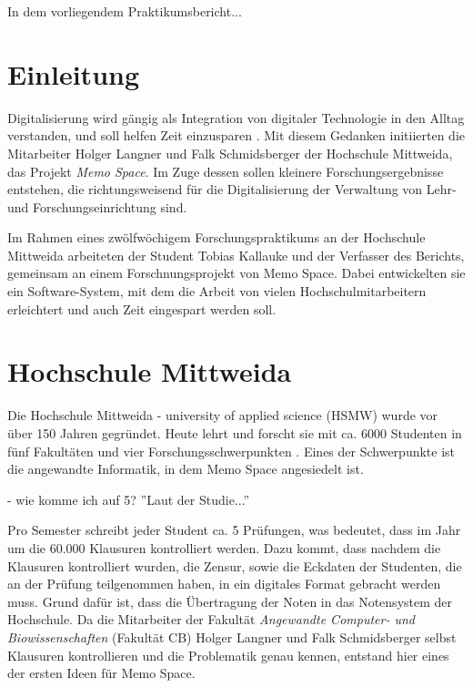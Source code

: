 \documentclass[nomenclature, onesided, 150]{HSMW-Thesis}
\begin{document}
\begin{Referat}
In dem vorliegendem Praktikumsbericht...

\end{Referat}


\Hauptteil


\chapter{Einleitung}
	Digitalisierung wird gängig als Integration von digitaler Technologie in den Alltag verstanden, und soll helfen Zeit einzusparen \cite{digital}. Mit diesem Gedanken initiierten die Mitarbeiter Holger Langner und Falk Schmidsberger der Hochschule Mittweida, das Projekt \textit{Memo Space}. Im Zuge dessen sollen kleinere Forschungsergebnisse entstehen, die richtungsweisend für die Digitalisierung der Verwaltung von Lehr- und Forschungseinrichtung sind.

	Im Rahmen eines zwölfwöchigem Forschungspraktikums an der Hochschule Mittweida arbeiteten der Student Tobias Kallauke und der Verfasser des Berichts, gemeinsam an einem Forschnungsprojekt von Memo Space. Dabei entwickelten sie ein Software-System, mit dem die Arbeit von vielen Hochschulmitarbeitern erleichtert und auch Zeit eingespart werden soll.


\chapter{Hochschule Mittweida}
	Die Hochschule Mittweida - university of applied science (HSMW)  wurde vor über 150 Jahren gegründet. Heute lehrt und forscht sie mit ca. 6000 Studenten in fünf Fakultäten und vier Forschungsschwerpunkten\cite{noauthor_hochschule_nodate} . Eines der Schwerpunkte ist die angewandte Informatik, in dem Memo Space angesiedelt ist.
	
	- wie komme ich auf 5? ''Laut der Studie...''
	
	Pro Semester schreibt jeder Student ca. 5 Prüfungen, was bedeutet, dass im Jahr um die 60.000 Klausuren kontrolliert werden. Dazu kommt, dass nachdem die Klausuren kontrolliert wurden, die Zensur, sowie die Eckdaten der Studenten, die an der Prüfung teilgenommen haben, in ein digitales Format gebracht werden muss. Grund dafür ist, dass die Übertragung der Noten in das Notensystem der Hochschule. Da die Mitarbeiter der Fakultät \textit{Angewandte Computer- und Biowissenschaften} (Fakultät CB) Holger Langner und Falk Schmidsberger selbst Klausuren kontrollieren und die Problematik genau kennen, entstand hier eines der ersten Ideen für Memo Space.
\end{document}
